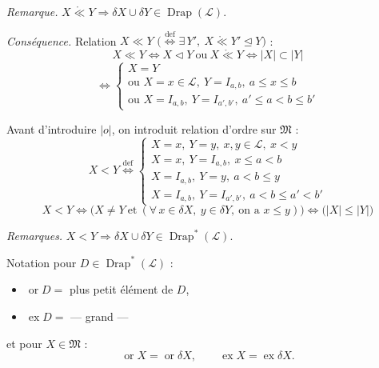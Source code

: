 \documentclass[11pt,a4paper]{article}
\begin{document}
\emph{Remarque.} $X \mathrel{\mathring{\ll}} Y \Longrightarrow \delta X \cup \delta Y \in \operatorname{Drap}(\mathcal{L})$.

\emph{Conséquence.} Relation $X \ll Y$ $\bigl(\overset{\mathrm{def}}{\iff} \exists\, Y',\ X \mathrel{\mathring{\ll}} Y' \trianglelefteq Y\bigr)$ :
\[
  X \ll Y \iff X \lhd Y \ \text{ou} \ X \mathrel{\mathring{\ll}} Y \iff |X| \subset |Y|
\]
\[
  \iff
  \begin{cases}
    X = Y \\
    \text{ou } X = x \in \mathcal{L},\ Y = I_{a,b},\ a \leq x \leq b \\
    \text{ou } X = I_{a,b},\ Y = I_{a',b'},\ a' \leq a < b \leq b'
  \end{cases}
\]


Avant d'introduire $|o|$, on introduit relation d'ordre sur $\mathfrak{M}$ :
\[
  X < Y \overset{\mathrm{def}}{\iff}
  \begin{cases}
    X = x,\ Y = y,\ x, y \in \mathcal{L},\ x < y \\
    X = x,\ Y = I_{a,b},\ x \leq a < b \\
    X = I_{a,b},\ Y = y,\ a < b \leq y \\
    X = I_{a,b},\ Y = I_{a',b'},\ a < b \leq a' < b'
  \end{cases}
\]
\[
  X < Y \iff \bigl( X \neq Y \ \text{et} \ (\forall\, x \in \delta X,\ y \in \delta Y,\ \text{on a } x \leq y) \bigr)
  \iff \bigl( |X| \leq |Y| \bigr)
\]


\emph{Remarques.} $X < Y \Longrightarrow \delta X \cup \delta Y \in \operatorname{Drap}^{*}(\mathcal{L})$.

Notation pour $D \in \operatorname{Drap}^{*}(\mathcal{L})$ :
\begin{itemize}
  \item $\operatorname{or} D = $ plus petit élément de $D$,
  \item $\operatorname{ex} D = $ --- grand ---
\end{itemize}
et  pour $X \in \mathfrak{M}$ :
\[
  \operatorname{or} X = \operatorname{or} \delta X , \qquad \operatorname{ex} X = \operatorname{ex} \delta X .
\]
\end{document}
